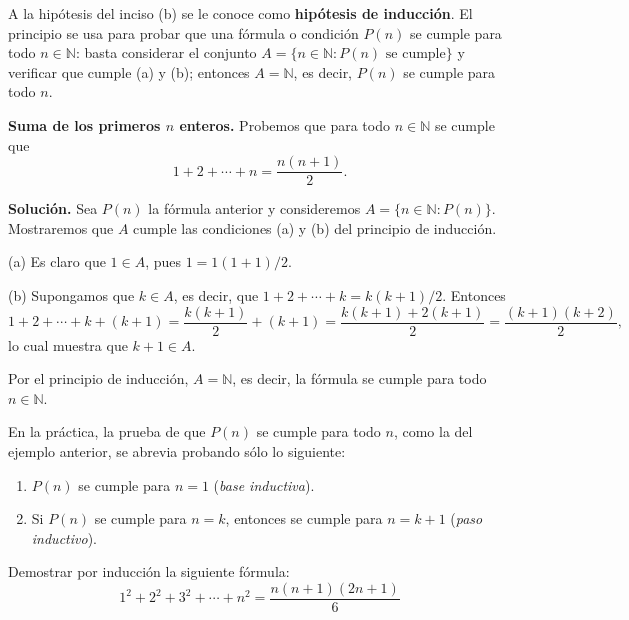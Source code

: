 \documentclass[12pt,a4paper]{book}
\begin{document}
  A la hipótesis del inciso (b) se le conoce como \textbf{hipótesis de inducción}. El principio se usa para probar que una fórmula o condición $P(n)$ se cumple para todo $n \in \mathbb{N}$: basta considerar el conjunto $A=\{n \in \mathbb{N} : P(n) \text{ se cumple}\}$ y verificar que cumple (a) y (b); entonces $A=\mathbb{N}$, es decir, $P(n)$ se cumple para todo $n$.
  
  \begin{ejemplo}
    \textbf{Suma de los primeros $n$ enteros.}
    Probemos que para todo $n \in \mathbb{N}$ se cumple que
    \begin{equation*}
      1+2+\cdots+n = \frac{n(n+1)}{2}.
    \end{equation*}
  
    \textbf{Solución.} Sea $P(n)$ la fórmula anterior y consideremos $A=\{n \in \mathbb{N} : P(n)\}$. Mostraremos que $A$ cumple las condiciones (a) y (b) del principio de inducción.
  
    (a) Es claro que $1 \in A$, pues $1 = 1(1+1)/2$.
  
    (b) Supongamos que $k \in A$, es decir, que $1+2+\cdots+k = k(k+1)/2$. Entonces
    \begin{equation*}
      1+2+\cdots+k+(k+1) = \frac{k(k+1)}{2}+(k+1) = \frac{k(k+1)+2(k+1)}{2} = \frac{(k+1)(k+2)}{2},
    \end{equation*}
    lo cual muestra que $k+1 \in A$.
  
    Por el principio de inducción, $A=\mathbb{N}$, es decir, la fórmula se cumple para todo $n \in \mathbb{N}$.
  \end{ejemplo}
  
  En la práctica, la prueba de que $P(n)$ se cumple para todo $n$, como la del ejemplo anterior, se abrevia probando sólo lo siguiente:
  \begin{enumerate}[label=(\roman*)]
    \item $P(n)$ se cumple para $n=1$ (\emph{base inductiva}).
    \item Si $P(n)$ se cumple para $n=k$, entonces se cumple para $n=k+1$ (\emph{paso inductivo}).
  \end{enumerate}
  
  \begin{ejemplo}
    Demostrar por inducción la siguiente fórmula:
    \begin{equation*}
      1^2+2^2+3^2+\cdots+n^2 = \frac{n(n+1)(2n+1)}{6}
    \end{equation*}
  \end{ejemplo}
  
\end{document}
